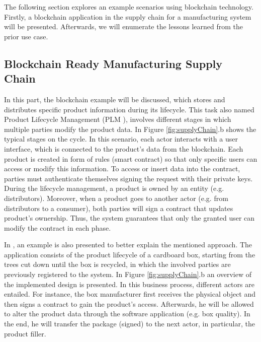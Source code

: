 The following section explores an example scenarios using blockchain technology. Firstly, a blockchain application in the supply chain for a manufacturing system will be presented. Afterwards, we will enumerate the lessons learned from the prior use case.

\subsection{Blockchain Ready Manufacturing Supply Chain}

In this part, the blockchain example \citep{abeyratne2016blockchain} will be discussed, which stores and distributes specific product information during its lifecycle. This task also named Product Lifecycle Management (PLM \citep{stark2015product}), involves different stages in which multiple parties modify the product data. In Figure \ref{fig:supplyChain}.b shows the typical stages on the cycle. In this scenario, each actor interacts with a user interface, which is connected to the product's data from the blockchain. Each product is created in form of rules (smart contract) so that only specific users can access or modify this information. To access or insert data into the contract, parties must authenticate themselves signing the request with their private keys. During the lifecycle management, a product is owned by an entity (e.g. distributors). Moreover, when a product goes to another actor (e.g. from distributors to a consumer), both parties will sign a contract that updates product's ownership. Thus, the system guarantees that only the granted user can modify the contract in each phase.

In \citep{abeyratne2016blockchain}, an example is also presented to better explain the mentioned approach. The application consists of the product lifecycle of a cardboard box, starting from the trees cut down until the box is recycled, in which the involved parties are previously registered to the system. In Figure \ref{fig:supplyChain}.b an overview of the implemented design is presented. In this business process, different actors are entailed. For instance, the box manufacturer first receives the physical object and then signs a contract to gain the product's access. Afterwards, he will be allowed to alter the product data through the software application (e.g. box quality). In the end, he will transfer the package (signed) to the next actor, in particular, the product filler.

